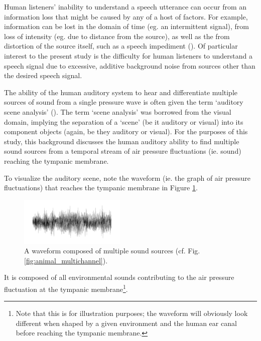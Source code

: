 Human listeners' inability to understand a speech utterance can occur from an information loss that might be caused by any of a host of factors.  For example, information can be lost in the domain of time (eg. an intermittent signal), from loss of intensity (eg. due to distance from the source), as well as the from distortion of the source itself, such as a speech impediment (\cite{mattys:12}).  Of particular interest to the present study is the difficulty for human listeners to understand a speech signal due to excessive, additive background noise from sources other than the desired speech signal.

The ability of the human auditory system to hear and differentiate multiple sources of sound from a single pressure wave is often given the term `auditory scene analysis' (\cite{bregman:94}).  The term `scene analysis' was borrowed from the visual domain, implying the separation of a `scene' (be it auditory or visual) into its component objects (again, be they auditory or visual). For the purposes of this study, this background discusses the human auditory ability to find multiple sound sources from a temporal stream of air pressure fluctuations (ie. sound) reaching the tympanic membrane.

To visualize the auditory scene, note the waveform (ie. the graph of air pressure fluctuations) that reaches the tympanic membrane in Figure \ref{fig:animal_singlechannel}.  
%
\begin{figure}
\centering
  \includegraphics[width=0.45\textwidth]{figure/single-channel-animals.png}
  \caption{A waveform composed of multiple sound sources (cf. Fig. \ref{fig:animal_multichannel}).}
  \label{fig:animal_singlechannel}
\end{figure}
%
It is composed of all environmental sounds contributing to the air pressure fluctuation at the tympanic membrane\footnote{Note that this is for illustration purposes; the waveform will obviously look different when shaped by a given environment and the human ear canal before reaching the tympanic membrane.}.

